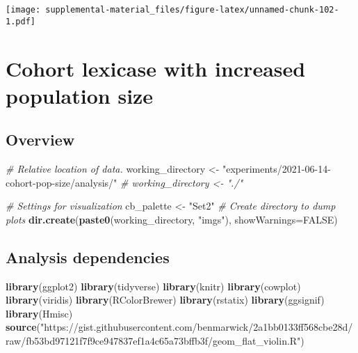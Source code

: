 \documentclass[]{book}
\newenvironment{Shaded}{\begin{snugshade}}{\end{snugshade}}
\newcommand{\CommentTok}[1]{\textcolor[rgb]{0.56,0.35,0.01}{\textit{#1}}}
\newcommand{\DataTypeTok}[1]{\textcolor[rgb]{0.13,0.29,0.53}{#1}}
\newcommand{\KeywordTok}[1]{\textcolor[rgb]{0.13,0.29,0.53}{\textbf{#1}}}
\newcommand{\NormalTok}[1]{#1}
\newcommand{\OtherTok}[1]{\textcolor[rgb]{0.56,0.35,0.01}{#1}}
\newcommand{\StringTok}[1]{\textcolor[rgb]{0.31,0.60,0.02}{#1}}
\begin{document}
\texttt{[image: supplemental-material\_files/figure-latex/unnamed-chunk-102-1.pdf]}

\hypertarget{cohort-lexicase-with-increased-population-size}{%
\chapter{Cohort lexicase with increased population size}\label{cohort-lexicase-with-increased-population-size}}

\hypertarget{overview-9}{%
\section{Overview}\label{overview-9}}

\begin{Shaded}
\begin{Highlighting}[]
\CommentTok{# Relative location of data.}
\NormalTok{working_directory <-}\StringTok{ "experiments/2021-06-14-cohort-pop-size/analysis/"}
\CommentTok{# working_directory <- "./"}

\CommentTok{# Settings for visualization}
\NormalTok{cb_palette <-}\StringTok{ "Set2"}
\CommentTok{# Create directory to dump plots}
\KeywordTok{dir.create}\NormalTok{(}\KeywordTok{paste0}\NormalTok{(working_directory, }\StringTok{"imgs"}\NormalTok{), }\DataTypeTok{showWarnings=}\OtherTok{FALSE}\NormalTok{)}
\end{Highlighting}
\end{Shaded}

\hypertarget{analysis-dependencies-9}{%
\section{Analysis dependencies}\label{analysis-dependencies-9}}

\begin{Shaded}
\begin{Highlighting}[]
\KeywordTok{library}\NormalTok{(ggplot2)}
\KeywordTok{library}\NormalTok{(tidyverse)}
\KeywordTok{library}\NormalTok{(knitr)}
\KeywordTok{library}\NormalTok{(cowplot)}
\KeywordTok{library}\NormalTok{(viridis)}
\KeywordTok{library}\NormalTok{(RColorBrewer)}
\KeywordTok{library}\NormalTok{(rstatix)}
\KeywordTok{library}\NormalTok{(ggsignif)}
\KeywordTok{library}\NormalTok{(Hmisc)}
\KeywordTok{source}\NormalTok{(}\StringTok{"https://gist.githubusercontent.com/benmarwick/2a1bb0133ff568cbe28d/raw/fb53bd97121f7f9ce947837ef1a4c65a73bffb3f/geom_flat_violin.R"}\NormalTok{)}
\end{Highlighting}
\end{Shaded}
\end{document}
